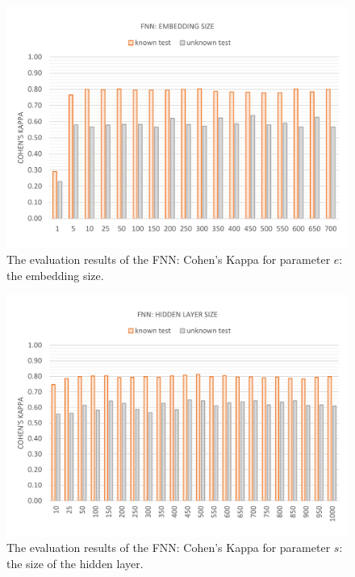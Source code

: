 \vspace{-13mm}
\begin{figure}[H]
	\centering\includegraphics[width=\textwidth]{images/evaluation_fnn_e_k}
	\caption[FNN Evaluation: Number of Past Words]{The evaluation results of the FNN: Cohen's Kappa for parameter $e$: the embedding size.}
	\label{f.evaluation.fnn.e.k}
\end{figure}

\vspace{-11mm}
\begin{figure}[H]
	\centering\includegraphics[width=\textwidth]{images/evaluation_fnn_s_k}
	\caption[FNN Evaluation: Hidden Layer Size]{The evaluation results of the FNN: Cohen's Kappa for parameter $s$: the size of the hidden layer.}
	\label{f.evaluation.fnn.s.k}
\end{figure}


